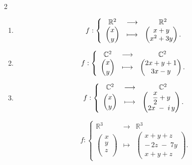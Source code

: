 \documentclass[a4paper,12pt]{article}
\begin{document}
\begin{multicols}{2}
\begin{exercice}[title=Exercice 6 $\star$ { [Raisonner, Calculer] }]{}{}
\begin{enumerate}
    \item
    \begin{equation*}
      f : \left \{
        \begin{array}{ccc}
          \mathbb{R}^2 &\longrightarrow &\mathbb{R}^2\\
          \dbinom{x}{y} &\longmapsto &
      \begin{pmatrix}
        x + y \\
        x^2 + 3y
      \end{pmatrix}.
        \end{array} \right.
      \end{equation*}

    \item
    \begin{equation*}
      f : \left \{
        \begin{array}{ccc}
          \mathbb{C}^2 &\longrightarrow &\mathbb{C}^2\\
          \dbinom{x}{y} &\longmapsto &
      \begin{pmatrix}
        2x + y + 1 \\
        3x - y
      \end{pmatrix}.
        \end{array} \right.
      \end{equation*}
      
    \item
    \begin{equation*}
      f : \left \{
        \begin{array}{ccc}
          \mathbb{C}^2 &\longrightarrow &\mathbb{C}^2\\
          \dbinom{x}{y} &\longmapsto &
      \begin{pmatrix}
        \dfrac{x}{2} + y \\
        2x \;-\; i\,y
      \end{pmatrix}.
        \end{array} \right.
      \end{equation*}

    \begin{equation*}
      f : \left \{
        \begin{array}{ccc}
          \mathbb{R}^3 &\longrightarrow &\mathbb{R}^3\\
          \begin{pmatrix}
            x\\
            y\\
            z\\
          \end{pmatrix} &\longmapsto &
      \begin{pmatrix}
        x + y + z \\
        -\,2z \;-\; 7y \\
        x + y + z
      \end{pmatrix}.
        \end{array} \right.
      \end{equation*}


\end{enumerate}
\end{exercice}
\end{multicols}
\end{document}
